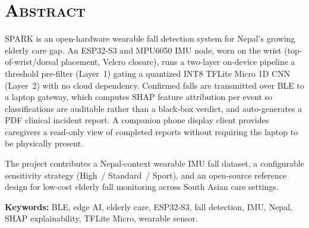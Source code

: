 \chapter*{\scshape Abstract}

SPARK is an open-hardware wearable fall detection system for Nepal's growing elderly care gap. An ESP32-S3 and MPU6050 IMU node, worn on the wrist (top-of-wrist/dorsal placement, Velcro closure), runs a two-layer on-device pipeline  a threshold pre-filter (Layer~1) gating a quantized INT8 TFLite Micro 1D CNN (Layer~2)  with no cloud dependency. Confirmed falls are transmitted over BLE to a laptop gateway, which computes SHAP feature attribution per event so classifications are auditable rather than a black-box verdict, and auto-generates a PDF clinical incident report. A companion phone display client provides caregivers a read-only view of completed reports without requiring the laptop to be physically present.

The project contributes a Nepal-context wearable IMU fall dataset, a configurable sensitivity strategy (High~/ Standard~/ Sport), and an open-source reference design for low-cost elderly fall monitoring across South Asian care settings.

\textbf{Keywords:} BLE, edge AI, elderly care, ESP32-S3, fall detection, IMU, Nepal, SHAP explainability, TFLite Micro, wearable sensor.